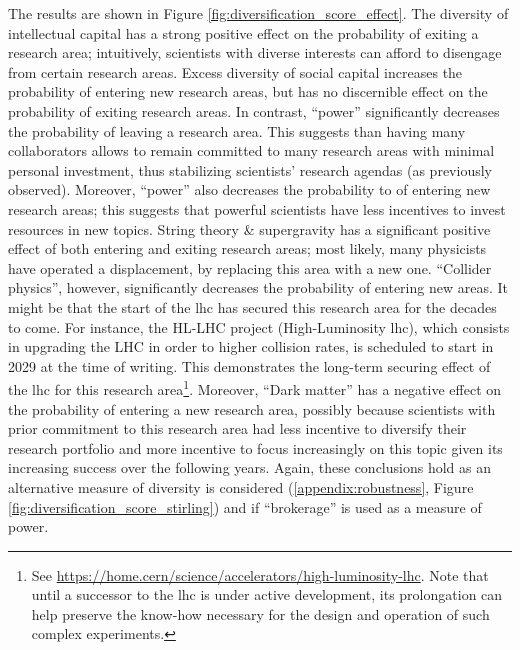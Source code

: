 \documentclass{article}
\begin{document}
The results are shown in Figure \ref{fig:diversification_score_effect}. The diversity of intellectual capital has a strong positive effect on the probability of exiting a research area; intuitively, scientists with diverse interests can afford to disengage from certain research areas. Excess diversity of social capital increases the probability of entering new research areas, but has no discernible effect on the probability of exiting research areas. In contrast, ``power'' significantly decreases the probability of leaving a research area. This suggests than having many collaborators allows to remain committed to many research areas with minimal personal investment, thus stabilizing scientists' research agendas (as previously observed). Moreover, ``power'' also decreases the probability to of entering new research areas; this suggests that powerful scientists have less incentives to invest resources in new topics. String theory \& supergravity has a significant positive effect of both entering and exiting research areas; most likely, many physicists have operated a displacement, by replacing this area with a new one. ``Collider physics'', however, significantly decreases the probability of entering new areas. It might be that the start of the \gls{lhc} has secured this research area for the decades to come. %
For instance, the HL-LHC project (High-Luminosity \gls{lhc}), which consists in upgrading the LHC in order to higher collision rates, is scheduled to start in 2029 at the time of writing. This demonstrates the long-term securing effect of the \gls{lhc} for this research area\footnote{See \url{https://home.cern/science/accelerators/high-luminosity-lhc}. Note that until a successor to the \gls{lhc} is under active development, its prolongation can help preserve the know-how necessary for the design and operation of such complex experiments. }. Moreover, ``Dark matter'' has a negative effect on the probability of entering a new research area, possibly because scientists with prior commitment to this research area had less incentive to diversify their research portfolio and more incentive to focus increasingly on this topic given its increasing success over the following years. Again, these conclusions hold as an alternative measure of diversity is considered (\ref{appendix:robustness}, Figure \ref{fig:diversification_score_stirling}) and if ``brokerage'' is used as a measure of power.
 
\end{document}
